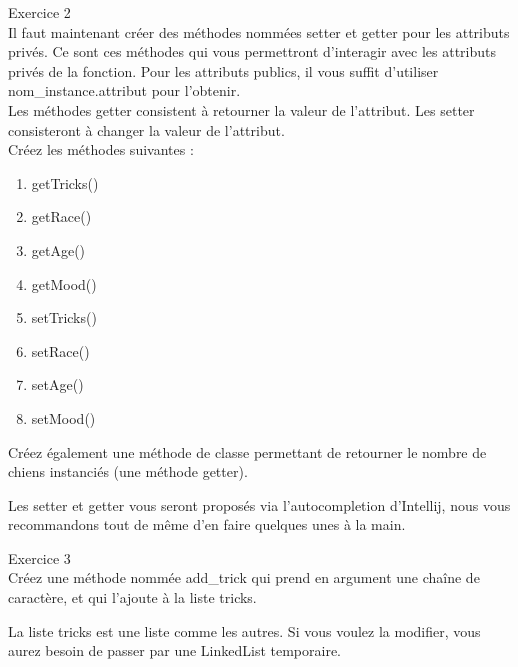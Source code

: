 \begin{Exercice} Exercice 2\\
    Il faut maintenant créer des méthodes nommées setter et getter pour les attributs privés. Ce sont ces méthodes qui vous permettront d'interagir avec les attributs privés de la fonction. Pour les attributs publics, il vous suffit d'utiliser nom\_instance.attribut pour l'obtenir. \\
    
    Les méthodes getter consistent à retourner la valeur de l'attribut. Les setter consisteront à changer la valeur de l'attribut. \\
    
    Créez les méthodes suivantes :
    \begin{enumerate}
    \item getTricks()
    \item getRace()
    \item getAge()
    \item getMood()
    \item setTricks()
    \item setRace()
    \item setAge()
    \item setMood()
    \end{enumerate}
    
    Créez également une méthode de classe permettant de retourner le nombre de chiens instanciés (une méthode getter).
   	
\begin{conseil}
   Les setter et getter vous seront proposés via l'autocompletion d'Intellij, nous vous recommandons tout de même d'en faire quelques unes à la main.
\end{conseil}
    
\begin{solution}
	
\end{solution}
\end{Exercice}

\begin{Exercice} Exercice 3\\
    Créez une méthode nommée add\_trick qui prend en argument une chaîne de caractère, et qui l'ajoute à la liste tricks. \\
   	
\begin{conseil}
   La liste tricks est une liste comme les autres. Si vous voulez la modifier, vous aurez besoin de passer par une LinkedList temporaire.
\end{conseil}
    
\begin{solution}
	
\end{solution}
\end{Exercice}

